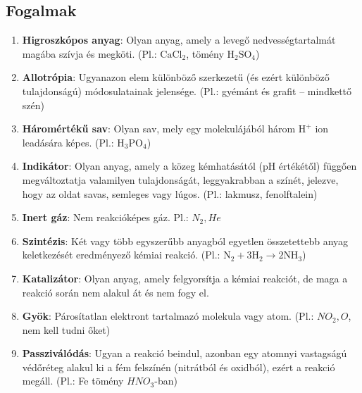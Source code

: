 \documentclass{article}
\begin{document}
\subsection{Fogalmak}
\begin{enumerate}
    \item \textbf{Higroszkópos anyag}: Olyan anyag, amely a levegő nedvességtartalmát magába szívja és megköti. (Pl.: $\text{CaCl}_2$, tömény $\text{H}_2\text{SO}_4$)
    \item \textbf{Allotrópia}: Ugyanazon elem különböző szerkezetű (és ezért különböző tulajdonságú) módosulatainak jelensége. (Pl.: gyémánt és grafit – mindkettő szén)
    \item \textbf{Háromértékű sav}: Olyan sav, mely egy molekulájából három $\text{H}^+$ ion leadására képes. (Pl.: $\text{H}_3\text{PO}_4$)
    \item \textbf{Indikátor}: Olyan anyag, amely a közeg kémhatásától (pH értékétől) függően megváltoztatja valamilyen tulajdonságát, leggyakrabban a színét, jelezve, hogy az oldat savas, semleges vagy lúgos. (Pl.: lakmusz, fenolftalein)
    \item \textbf{Inert gáz}: Nem reakcióképes gáz. Pl.: $N_2, He$
    \item \textbf{Szintézis}: Két vagy több egyszerűbb anyagból egyetlen összetettebb anyag keletkezését eredményező kémiai reakció. (Pl.: $\text{N}_2 + 3\text{H}_2 \rightarrow 2\text{NH}_3$)
    \item \textbf{Katalizátor}: Olyan anyag, amely felgyorsítja a kémiai reakciót, de maga a reakció során nem alakul át és nem fogy el.
    \item \textbf{Gyök}: Párosítatlan elektront tartalmazó molekula vagy atom. (Pl.: $NO_2, O$, nem kell tudni őket)
    \item \textbf{Passziválódás}: Ugyan a reakció beindul, azonban egy atomnyi vastagságú védőréteg alakul ki a fém felszínén (nitrátból és oxidból), ezért a reakció megáll. (Pl.: Fe tömény $HNO_3$-ban)
\end{enumerate}
\end{document}
